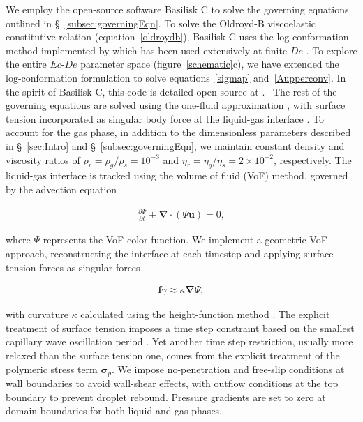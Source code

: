 \documentclass{jfm}
\newcommand{\DL}[1]{{\textcolor{black}{#1}}}
\newcommand{\oo}{\color{black} \normalfont}
\newcommand{\bb}{\color{black} \normalfont}
\begin{document}
We employ the open-source software Basilisk C \citep{basilliskpopinet, popinet2015quadtree} to solve the governing equations outlined in \S~\ref{subsec:governingEqn}.
\oo
To solve the Oldroyd-B viscoelastic constitutive relation (equation~\eqref{oldroydb}), Basilisk C uses the log-conformation method \citep{fattal2004constitutive} implemented by \citet{lopez2019adaptive} which has been used extensively at finite $De$ \citep{turkoz2018axisymmetric, turkoz2021simulation}. To explore the entire $Ec$-$De$ parameter space  (figure~\ref{schematic}c), we have extended the log-conformation formulation to solve equations~\eqref{sigmap} and~\eqref{Aupperconv}. In the spirit of Basilisk C, this code is detailed open-source at \citet{vatsalElastoFlow2024}.\bb\,
The rest of the governing equations are solved using the one-fluid approximation \citep{tryggvason2011direct}, with surface tension incorporated as singular body force at \DL{the} liquid-gas interface \citep{brackbill1992continuum}.
To account for the gas phase, in addition to the dimensionless parameters described in \S~\ref{sec:Intro} and \S~\ref{subsec:governingEqn}, we maintain constant density and viscosity ratios of $\rho_{r} = \rho_{g}/\rho_{s} = 10^{-3}$ and $\eta_{r} = \eta_{g}/\eta_{s} = 2 \times 10^{-2}$, respectively.
The liquid-gas interface is tracked using the volume of fluid (VoF) method, governed by the advection equation

\begin{align}
	\frac{\partial \Psi}{\partial t} + \boldsymbol{\nabla\cdot}\left(\Psi\boldsymbol{u}\right) = 0,
	\label{volfracconserve}
\end{align}

\noindent where $\Psi$ represents the VoF color function. We implement a geometric VoF approach, reconstructing the interface at each timestep and applying surface tension forces as singular forces \citep{popinet2009accurate, brackbill1992continuum}

\begin{align}
	\boldsymbol{f}{\gamma} \approx \kappa \boldsymbol{\nabla} \Psi,
	\label{f}
\end{align}

\noindent with curvature $\kappa$ calculated using the height-function method \citep{popinet2018numerical}. The explicit treatment of surface tension imposes a time step constraint based on the smallest capillary wave oscillation period \citep{popinet2009accurate}. Yet another time step restriction, usually more relaxed than the surface tension one, comes from the explicit treatment of the polymeric stress term $\boldsymbol{\sigma}_p$.
We impose no-penetration and free-slip conditions at wall boundaries to avoid wall-shear effects, with outflow conditions at the top boundary to prevent droplet rebound. Pressure gradients are set to zero at domain boundaries for both liquid and gas phases.
\end{document}
